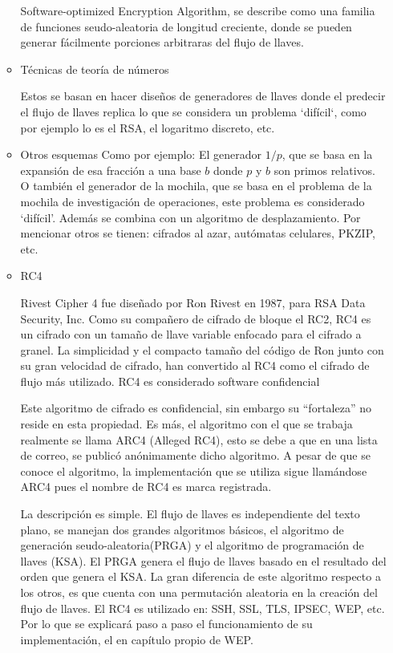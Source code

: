 \begin{itemize}
\begin{itemize}
			Software-optimized Encryption Algorithm, se describe como una familia de funciones seudo-aleatoria de longitud creciente, donde se pueden generar fácilmente porciones arbitraras del flujo de llaves.
			\item Técnicas de teoría de números
			
			Estos se basan en hacer diseños de generadores de llaves donde el predecir el flujo de llaves replica lo que se considera un problema `difícil`, como por ejemplo lo es el RSA, el logaritmo discreto, etc.
			\item Otros esquemas
			Como por ejemplo: 
			El generador $1/p$, que se basa en la expansión de esa fracción a una base $b$ donde $p$ y $b$ son primos relativos. O también el generador de la mochila, que se basa en el problema de la mochila de investigación de operaciones, este problema es considerado `difícil'. Además  se combina con un algoritmo de desplazamiento.
			Por mencionar otros se tienen: cifrados al azar, autómatas celulares, PKZIP, etc.
			\item RC4
			
			Rivest Cipher 4 fue diseñado por Ron Rivest en 1987, para RSA Data Security, Inc. Como su compañero de cifrado de bloque el RC2, RC4 es un cifrado con un tamaño de llave variable enfocado para el cifrado a granel. La simplicidad y el compacto tamaño del código de Ron junto con su gran velocidad de cifrado, han convertido al RC4 como el cifrado de flujo más utilizado. 
			RC4 es considerado software confidencial
			
			Este algoritmo de cifrado es confidencial, sin embargo su ``fortaleza'' no reside en esta propiedad. Es más, el algoritmo con el que se trabaja realmente se llama ARC4 (Alleged RC4), esto se debe a que en una lista de correo, se publicó anónimamente dicho algoritmo. A pesar de que se conoce el algoritmo, la implementación que se utiliza sigue llamándose ARC4 pues el nombre de RC4 es marca registrada. 
			
			La descripción es simple. El flujo de llaves es independiente del texto plano, se manejan dos grandes algoritmos básicos, el algoritmo de generación seudo-aleatoria(PRGA)  y el algoritmo de programación de llaves (KSA).  El PRGA genera el flujo de llaves basado en el resultado del orden que genera el KSA.
			La gran diferencia de este algoritmo respecto a los otros, es que cuenta con una permutación aleatoria en la creación del flujo de llaves.
			El RC4 es utilizado en: SSH, SSL, TLS, IPSEC, WEP, etc. Por lo que se explicará paso a paso el funcionamiento de  su implementación, el en capítulo propio de WEP.
		\end{itemize}
	

\end{itemize}
